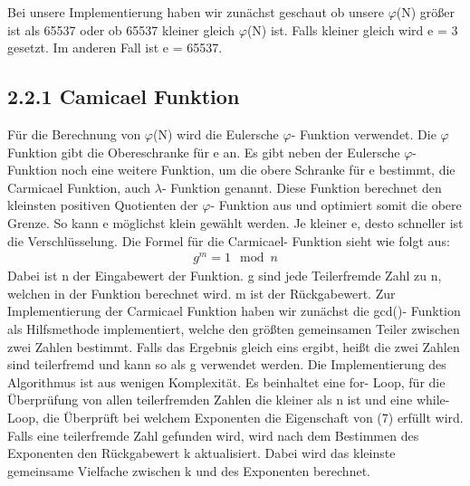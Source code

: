 \documentclass[course=asp]{aspdoc}
\begin{document}
Bei unsere Implementierung haben wir zunächst geschaut ob unsere $\varphi $(N) größer ist als 65537 oder ob 65537 kleiner gleich $\varphi $(N) ist. Falls kleiner gleich wird e = 3 gesetzt. Im anderen Fall ist e = 65537.
\subsection*{2.2.1 Camicael Funktion} 
Für die Berechnung von $\varphi $(N) wird die Eulersche $\varphi $- Funktion verwendet. Die $\varphi $ Funktion gibt die Obereschranke für e an. Es gibt neben der Eulersche $\varphi $- Funktion noch eine weitere Funktion, um die obere Schranke für e bestimmt, die Carmicael Funktion, auch $\lambda $- Funktion genannt. Diese Funktion berechnet den kleinsten positiven Quotienten der $\varphi $- Funktion aus und optimiert somit die obere Grenze. So kann e möglichst klein gewählt werden. Je kleiner e, desto schneller ist die Verschlüsselung. Die Formel für die Carmicael- Funktion sieht wie folgt aus:
\begin{align}
	g^m = 1 \mod n
\end{align} 
Dabei ist n der Eingabewert der Funktion. g sind jede Teilerfremde Zahl zu n, welchen in der Funktion berechnet wird. m ist der Rückgabewert. Zur Implementierung der Carmicael Funktion haben wir zunächst die gcd()- Funktion als Hilfsmethode implementiert, welche den größten gemeinsamen Teiler zwischen zwei Zahlen bestimmt. Falls das Ergebnis gleich eins ergibt, heißt die zwei Zahlen sind teilerfremd und kann so als g verwendet werden. Die Implementierung des Algorithmus ist aus wenigen Komplexität. Es beinhaltet eine for- Loop, für die Überprüfung von allen teilerfremden Zahlen die kleiner als n ist und eine while- Loop, die Überprüft bei welchem Exponenten die Eigenschaft von (7) erfüllt wird. Falls eine teilerfremde Zahl gefunden wird, wird nach dem Bestimmen des Exponenten den Rückgabewert k aktualisiert. Dabei wird das kleinste gemeinsame Vielfache zwischen k und des Exponenten berechnet.
\end{document}
